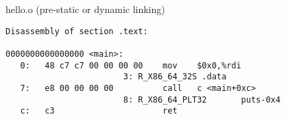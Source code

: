 \begin{frame}[fragile]{hello.o (pre-static or dynamic linking)}
\begin{Verbatim}[commandchars=\\\{\},fontsize=\fontsize{9}{10}\selectfont]
Disassembly of section .text:

0000000000000000 <main>:
   0:   48 c7 c7 00 00 00 00    mov    $0x0,%rdi
                        3: R_X86_64_32S .data
   7:   e8 00 00 00 00          call   c <main+0xc>
                        8: R_X86_64_PLT32       puts-0x4
   c:   c3                      ret    
\end{Verbatim}
\end{frame}

